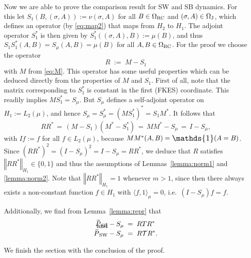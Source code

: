 \documentclass{dis}
\theoremstyle{citing}
\begin{document}
Now we are able to prove the comparison result for SW and SB dynamics. 
For this let $S_1(B,(\sigma,A)):=\nu(\sigma,A)$ for all 
$B\in{\Omega}_{\rm RC}$ and $(\sigma,A)\in{\Omega}_{\rm J}$, which defines 
an operator (by \eqref{eq:map2}) that maps from $H_2$ to $H_1$. 
The adjoint operator $S_1^*$ is then given by 
$S_1^*((\sigma,A),B):=\mu(B)$, and thus 
$S_1 S_1^*(A,B) = S_{\mu}(A,B) = \mu(B)$ for all $A,B\in{\Omega}_{\rm RC}$. 
For the proof we choose the operator
\[
R \;:=\; M - S_1
\]
with $M$ from \eqref{eq:M}.
This operator has some useful properties which can be deduced 
directly from the properties of $M$ and $S_1$.
First of all, note that the matrix corresponding to $S_1^*$ is 
constant in the first ({FKES}) coordinate. 
This readily implies $M S_1^* = S_\mu$. 
But $S_\mu$ defines a self-adjoint operator on ${H_1}:=L_2(\mu)$, 
and hence $S_\mu=S_\mu^*=(M S_1^*)^*=S_1 M^*$.
It follows that 
\[
R R^* \,=\, (M-S_1)(M^*-S_1^*) \,=\, M M^* - S_\mu 
\,=\, I - S_\mu,
\] 
with $If:=f$ for all $f\in L_2(\mu)$, because 
$M M^*(A,B)={\scalebox{1.2}{\raisebox{-0.2mm}{$\mathds{1}$}}}(A=B)$. 
Since $(R R^*)^2 = (I - S_\mu)^2 = I-S_\mu = R R^*$, 
we deduce that $R$ satisfies ${\left\Vert {R R^*} \right\Vert}_{H_1}\in\{0,1\}$ 
and thus the assumptions of Lemmas~\ref{lemma:norm1} and 
\ref{lemma:norm2}. 
Note that ${\left\Vert {R R^*} \right\Vert}_{H_1}=1$ whenever $m>1$, since 
then there always exists a non-constant function $f\in H_1$ 
with ${\langle} f,1{\rangle}_\mu=0$, i.e.~$(I-S_\mu)f=f$.

Additionally, we find from Lemma~\ref{lemma:repr} that 
\begin{align*}
{{\raisebox{2pt}{ ${\widetilde{{}}}$ }\mkern-14mu P}_{\rm SB}}-S_\mu \;&=\; R T R^* \\[-5mm]
\intertext{\vspace*{-2mm} and}
{{\raisebox{2pt}{ ${\widetilde{{}}}$ }\mkern-14mu P}_{\rm SW}}-S_\mu \;&=\; R {\mathcal{T}} R^*.
\end{align*}

We finish the section with the conclusion of the proof.
\end{document}
